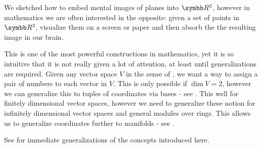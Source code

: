 \begin{remark}\label{remark:coordinate_systems}
  We sketched how to embed mental images of planes into \( \BR^2 \), however in mathematics we are often interested in the opposite: given a set of points in \( \BR^2 \), visualize them on a screen or paper and then absorb the the resulting image in our brain.

  This is one of the most powerful constructions in mathematics, yet it is so intuitive that it is not really given a lot of attention, at least until generalizations are required. Given any vector space \( V \) in the sense of , we want a way to assign a pair of numbers to each vector in \( V \). This is only possible if \( \dim V = 2 \), however we can generalize this to tuples of coordinates via bases - see . This well for finitely dimensional vector spaces, however we need to generalize these notion for infinitely dimensional vector spaces and general modules over rings. This allows us to generalize coordinates further to manifolds - see .

  See  for immediate generalizations of the concepts introduced here.
\end{remark}
